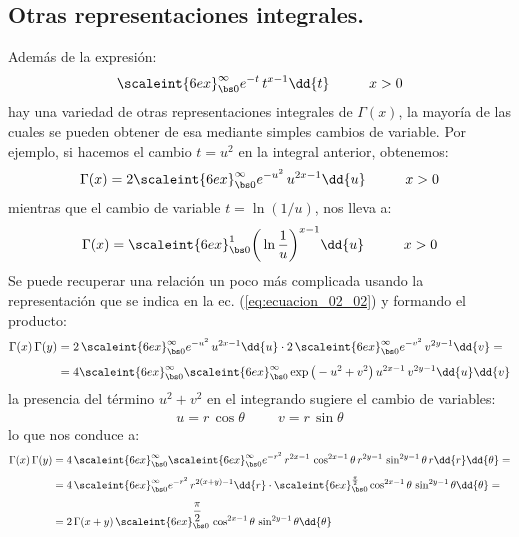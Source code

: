 \subsection{Otras representaciones integrales.}

Además de la expresión:
\begin{align*}
\scaleint{6ex}_{\bs 0}^{\infty} e^{-t} \, t^{x- 1} \dd{t} \hspace{1cm} x > 0
\end{align*}
hay una variedad de otras representaciones integrales de $\Gamma (x)$, la mayoría de las cuales se pueden obtener de esa mediante simples cambios de variable. Por ejemplo, si hacemos el cambio $t = u^{2}$ en la integral anterior, obtenemos:
\begin{align}
\Gamma (x) = 2 \scaleint{6ex}_{\bs 0}^{\infty} e^{-u^{2}} \, u^{2x-1} \dd{u} \hspace{1cm} x > 0
\label{eq:ecuacion_02_20}
\end{align}
mientras que el cambio de variable $t = \ln (1/u)$, nos lleva a:
\begin{align}
\Gamma (x) = \scaleint{6ex}_{\bs 0}^{1} \bigg( \ln \dfrac{1}{u} \bigg)^{x-1} \dd{u} \hspace{1cm} x > 0
\label{eq:ecuacion_02_21}
\end{align}
Se puede recuperar una relación un poco más complicada usando la representación que se indica en la ec. (\ref{eq:ecuacion_02_02}) y formando el producto:
\begin{align*}
\Gamma (x) \, \Gamma(y) &= 2 \, \scaleint{6ex}_{\bs 0}^{\infty} e^{-u^{2}} \, u^{2x-1} \dd{u} \cdot 2 \, \scaleint{6ex}_{\bs 0}^{\infty} e^{-v^{2}} \, v^{2y-1} \dd{v} = \\[0.5em]
&= 4 \scaleint{6ex}_{\bs 0}^{\infty} \scaleint{6ex}_{\bs 0}^{\infty} \exp\big( - u^{2} + v^{2} \big) \, u^{2x-1} \, v^{2y-1} \dd{u} \dd{v}
\end{align*}
la presencia del término $u^{2} + v^{2}$ en el integrando sugiere el cambio de variables:
\begin{align*}
u = r \, \cos \theta \hspace{1cm} v = r \, \sin \theta
\end{align*}
lo que nos conduce a:
\begin{align*}
\Gamma (x) \, \Gamma (y) &= 4 \, \scaleint{6ex}_{\bs 0}^{\infty} \scaleint{6ex}_{\bs 0}^{\infty} e^{-r^{2}} \, r^{2x-1} \, \cos^{2x-1} \theta \, r^{2y-1} \, \sin^{2y-1} \theta \, r \dd{r} \dd{\theta} = \\[0.5em]
&= 4 \, \scaleint{6ex}_{\bs 0}^{\infty} e^{-r^{2}} \, r^{2(x+y)-1} \dd{r} \cdot \scaleint{6ex}_{\bs 0}^{\frac{\pi}{2}} \cos^{2x-1} \theta \, \sin^{2y-1} \theta \dd{\theta} = \\[0.5em]
&= 2 \, \Gamma(x + y) \, \scaleint{6ex}_{\bs 0}^{\dfrac{\pi}{2}} \, \cos^{2x-1} \theta \, \sin^{2y-1} \theta \dd{\theta}
\end{align*}
